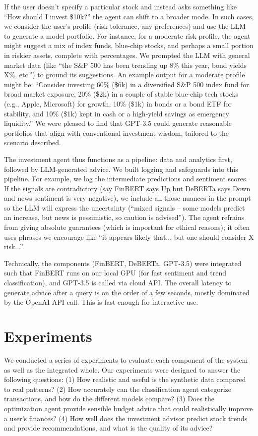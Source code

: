 \documentclass{scrartcl}
\begin{document}
If the user doesn’t specify a particular stock and instead asks something like “How should I invest \$10k?” the agent can shift to a broader mode. In such cases, we consider the user’s profile (risk tolerance, any preferences) and use the LLM to generate a model portfolio. For instance, for a moderate risk profile, the agent might suggest a mix of index funds, blue-chip stocks, and perhaps a small portion in riskier assets, complete with percentages. We prompted the LLM with general market data (like “the S\&P 500 has been trending up 8\% this year, bond yields X\%, etc.”) to ground its suggestions. An example output for a moderate profile might be: “Consider investing 60\% (\$6k) in a diversified S\&P 500 index fund for broad market exposure, 20\% (\$2k) in a couple of stable blue-chip tech stocks (e.g., Apple, Microsoft) for growth, 10\% (\$1k) in bonds or a bond ETF for stability, and 10\% (\$1k) kept in cash or a high-yield savings as emergency liquidity.” We were pleased to find that GPT-3.5 could generate reasonable portfolios that align with conventional investment wisdom, tailored to the scenario described.

The investment agent thus functions as a pipeline: data and analytics first, followed by LLM-generated advice. We built logging and safeguards into this pipeline. For example, we log the intermediate predictions and sentiment scores. If the signals are contradictory (say FinBERT says Up but DeBERTa says Down and news sentiment is very negative), we include all those nuances in the prompt so the LLM will express the uncertainty (“mixed signals – some models predict an increase, but news is pessimistic, so caution is advised”). The agent refrains from giving absolute guarantees (which is important for ethical reasons); it often uses phrases we encourage like “it appears likely that... but one should consider X risk...”.

Technically, the components (FinBERT, DeBERTa, GPT-3.5) were integrated such that FinBERT runs on our local GPU (for fast sentiment and trend classification), and GPT-3.5 is called via cloud API. The overall latency to generate advice after a query is on the order of a few seconds, mostly dominated by the OpenAI API call. This is fast enough for interactive use.

\section{Experiments}
We conducted a series of experiments to evaluate each component of the system as well as the integrated whole. Our experiments were designed to answer the following questions: (1) How realistic and useful is the synthetic data compared to real patterns? (2) How accurately can the classification agent categorize transactions, and how do the different models compare? (3) Does the optimization agent provide sensible budget advice that could realistically improve a user's finances? (4) How well does the investment advisor predict stock trends and provide recommendations, and what is the quality of its advice?
\end{document}
